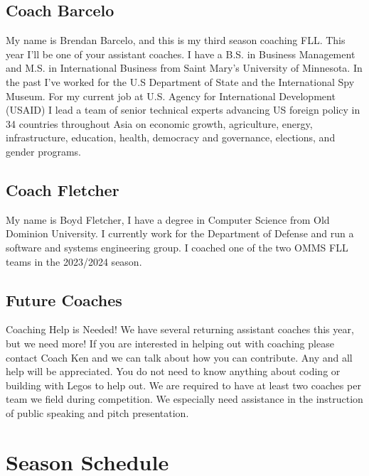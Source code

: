 \documentclass[letter]{article}
\begin{document}
\hypertarget{coach-barcelo}{%
\subsection{Coach Barcelo}\label{coach-barcelo}}

My name is Brendan Barcelo, and this is my third season coaching FLL. This year I'll be one of your assistant coaches. I have a B.S. in Business Management and M.S. in International Business from Saint Mary's University of Minnesota. In the past I've worked for the U.S Department of State and the International Spy Museum. For my current job at U.S. Agency for International Development (USAID) I lead a team of senior technical experts advancing US foreign policy in 34 countries throughout Asia on economic growth, agriculture, energy, infrastructure, education, health, democracy and governance, elections, and gender programs.

\hypertarget{coach-fletcher}{%
\subsection{Coach Fletcher}\label{coach-fletcher}}

My name is Boyd Fletcher, I have a degree in Computer Science from Old Dominion University. I currently work for the Department of Defense and run a software and systems engineering group. I coached one of the two OMMS FLL teams in the 2023/2024 season.

\hypertarget{future-coaches}{%
\subsection{Future Coaches}\label{future-coaches}}

Coaching Help is Needed! We have several returning assistant coaches
this year, but we need more! If you are interested in helping out with
coaching please contact Coach Ken and we can talk about how you can contribute.
Any and all help will be appreciated. You do not need to know anything about coding or building with Legos to help out. We are required to have at least two coaches per team we field during competition. We especially need assistance in the instruction of public speaking and pitch presentation.

\hypertarget{meeting-schedule}{%
\section{Season Schedule}\label{meeting-schedule}}
\end{document}
